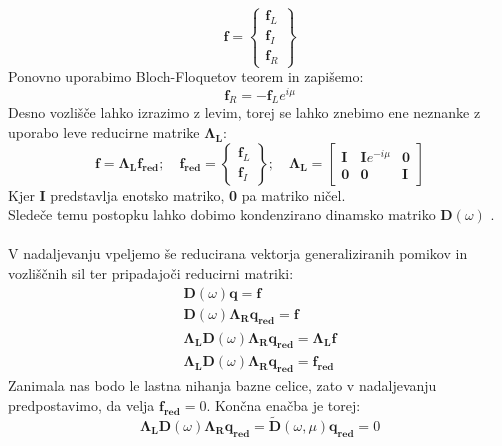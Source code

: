 \documentclass[12pt]{report}
\begin{document}
\begin{equation}
  \mathbf{f}=
    \begin{Bmatrix}
      \mathbf{f}_L \\
      \mathbf{f}_I \\
      \mathbf{f}_R
    \end{Bmatrix}
\end{equation}
Ponovno uporabimo Bloch-Floquetov teorem in zapišemo:
\begin{equation}
  \mathbf{f}_R = -\mathbf{f}_L e^{i\mu}
\end{equation}
Desno vozlišče lahko izrazimo z levim, torej se lahko znebimo ene neznanke z uporabo leve reducirne matrike $\mathbf{\Lambda_L}$:
\begin{equation}
  \mathbf{f}=\mathbf{\Lambda_L f_{red}}; \quad 
  \mathbf{f_{red}} = \begin{Bmatrix}
    \mathbf{f}_L \\
    \mathbf{f}_I
  \end{Bmatrix}; \quad
  \mathbf{\Lambda_L} = \begin{bmatrix}
    \mathbf{I} & \mathbf{I}e^{-i\mu} & \mathbf{0} \\
    \mathbf{0} & \mathbf{0} & \mathbf{I}
  \end{bmatrix}
\end{equation}
Kjer \textbf{I} predstavlja enotsko matriko, \textbf{0} pa matriko ničel.\\
Sledeče temu postopku lahko dobimo kondenzirano dinamsko matriko $\mathbf{D}(\omega)$ \cite{kosir}. 
\\
\\
V nadaljevanju vpeljemo še reducirana vektorja generaliziranih pomikov in vozliščnih sil ter pripadajoči reducirni matriki:
\begin{equation*}
  \begin{aligned}
    \mathbf{D}(\omega)\mathbf{q}=\mathbf{f} \\
    \mathbf{D}(\omega)\mathbf{\Lambda_R q_{red}} = \mathbf{f} \\
    \mathbf{\Lambda_L} \mathbf{D}(\omega)\mathbf{\Lambda_R q_{red}} = \mathbf{\Lambda_L} \mathbf{f} \\
    \mathbf{\Lambda_L} \mathbf{D}(\omega)\mathbf{\Lambda_R q_{red}} = \mathbf{f_{red}}
  \end{aligned}
\end{equation*}
Zanimala nas bodo le lastna nihanja bazne celice, zato v nadaljevanju predpostavimo, da velja $\mathbf{f_{red}}=0$.
Končna enačba je torej:
\begin{equation}
  \mathbf{\Lambda_L} \mathbf{D}(\omega)\mathbf{\Lambda_R q_{red}} = \mathbf{\widetilde{D}}(\omega, \mu) \mathbf{q_{red}} = 0
\end{equation}
\end{document}
